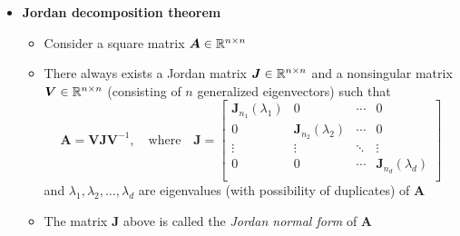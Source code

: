\documentclass[12pt,a4paper]{article}
\begin{document}
\begin{itemize}
\item \textbf{Jordan decomposition theorem}
  \begin{itemize}
  \item Consider a square matrix $\bm{A} \in\mathbb{R}^{n\times n}$
  \item There always exists
    a Jordan matrix $\bm{J}\in \mathbb{R}^{n\times n}$ and
    a nonsingular matrix $\bm{V}\in \mathbb{R}^{n\times n}$ (consisting of $n$ generalized eigenvectors) such that
    \begin{equation}\nonumber%
      \bm{A} = \bm{V} \bm{J} \bm{V}^{-1},
      \quad\text{where}\quad
      \bm{J} =
      \begin{bmatrix}
        \bm{J}_{n_{1}}(\lambda_{1}) & 0 & \cdots & 0 \\
        0 & \bm{J}_{n_{2}}(\lambda_{2}) & \cdots & 0 \\
        \vdots & \vdots & \ddots & \vdots \\
        0 & 0 & \cdots & \bm{J}_{n_{d}}(\lambda_{d}) \\
      \end{bmatrix}
    \end{equation}
    and $\lambda_{1},\lambda_{2},\ldots, \lambda_{d}$ are eigenvalues (with possibility of duplicates) of $\bm{A}$
  \item The matrix $\bm{J}$ above is called the \emph{Jordan normal form} of $\bm{A}$
  \end{itemize}


\end{itemize}
\end{document}
